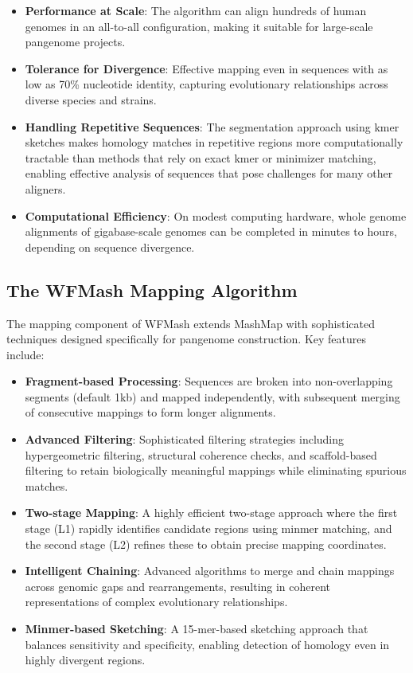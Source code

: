 \documentclass{article}
\begin{document}
\begin{itemize}
    \item \textbf{Performance at Scale}: The algorithm can align hundreds of human genomes in an all-to-all configuration, making it suitable for large-scale pangenome projects.
    
    \item \textbf{Tolerance for Divergence}: Effective mapping even in sequences with as low as 70\% nucleotide identity, capturing evolutionary relationships across diverse species and strains.
    
    \item \textbf{Handling Repetitive Sequences}: The segmentation approach using kmer sketches makes homology matches in repetitive regions more computationally tractable than methods that rely on exact kmer or minimizer matching, enabling effective analysis of sequences that pose challenges for many other aligners.
    
    \item \textbf{Computational Efficiency}: On modest computing hardware, whole genome alignments of gigabase-scale genomes can be completed in minutes to hours, depending on sequence divergence.
\end{itemize}

\subsection{The WFMash Mapping Algorithm}

The mapping component of WFMash extends MashMap with sophisticated techniques designed specifically for pangenome construction. Key features include:

\begin{itemize}
    \item \textbf{Fragment-based Processing}: Sequences are broken into non-overlapping segments (default 1kb) and mapped independently, with subsequent merging of consecutive mappings to form longer alignments.
    
    \item \textbf{Advanced Filtering}: Sophisticated filtering strategies including hypergeometric filtering, structural coherence checks, and scaffold-based filtering to retain biologically meaningful mappings while eliminating spurious matches.
    
    \item \textbf{Two-stage Mapping}: A highly efficient two-stage approach where the first stage (L1) rapidly identifies candidate regions using minmer matching, and the second stage (L2) refines these to obtain precise mapping coordinates.
    
    \item \textbf{Intelligent Chaining}: Advanced algorithms to merge and chain mappings across genomic gaps and rearrangements, resulting in coherent representations of complex evolutionary relationships.
    
    \item \textbf{Minmer-based Sketching}: A 15-mer-based sketching approach that balances sensitivity and specificity, enabling detection of homology even in highly divergent regions.
\end{itemize}
\end{document}
